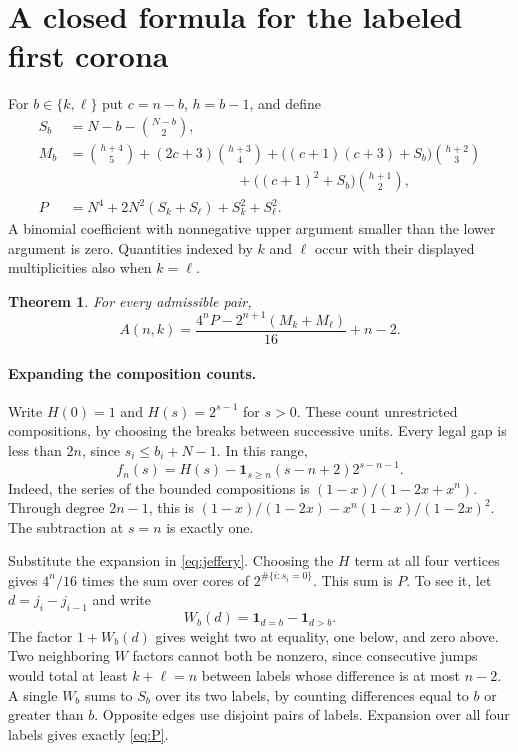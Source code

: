 \documentclass[11pt,letterpaper]{article}
\newtheorem{theorem}{Theorem}[section]
\newcommand{\one}{\mathbf 1}
\newcommand{\cc}[2]{\binom{#1}{#2}}
\begin{document}
\newpage
\section{A closed formula for the labeled first corona}
For $b\in\{k,\ell\}$ put $c=n-b$, $h=b-1$, and define
\begin{align}
 S_b&=N-b-\cc{N-b}{2},\nonumber\\
 M_b&=\cc{h+4}{5}+(2c+3)\cc{h+3}{4}
  +\big((c+1)(c+3)+S_b\big)\cc{h+2}{3} \nonumber\\[-2pt]
 &\hspace{12em}+\big((c+1)^2+S_b\big)\cc{h+1}{2},\label{eq:mark}\\
 P&=N^4+2N^2(S_k+S_\ell)+S_k^2+S_\ell^2.\label{eq:P}
\end{align}
A binomial coefficient with nonnegative upper argument smaller than the lower argument is zero. Quantities indexed by $k$ and $\ell$ occur with their displayed multiplicities also when $k=\ell$.
\begin{theorem}\label{th:main}
For every admissible pair,
\begin{equation}\label{eq:main}
 \boxed{\displaystyle A(n,k)=\frac{4^n P-2^{n+1}(M_k+M_\ell)}{16}+n-2.}
\end{equation}
\end{theorem}

\paragraph{Expanding the composition counts.}
Write $H(0)=1$ and $H(s)=2^{s-1}$ for $s>0$. These count unrestricted compositions, by choosing the breaks between successive units. Every legal gap is less than $2n$, since $s_i\le b_i+N-1$. In this range,
\[
 f_n(s)=H(s)-\one_{s\ge n}(s-n+2)2^{s-n-1}.
\]
Indeed, the series of the bounded compositions is $(1-x)/(1-2x+x^n)$. Through degree $2n-1$, this is $(1-x)/(1-2x)-x^n(1-x)/(1-2x)^2$. The subtraction at $s=n$ is exactly one.

Substitute the expansion in \eqref{eq:jeffery}. Choosing the $H$ term at all four vertices gives $4^n/16$ times the sum over cores of $2^{\#\{i:s_i=0\}}$. This sum is $P$. To see it, let $d=j_i-j_{i-1}$ and write
\[
 W_b(d)=\one_{d=b}-\one_{d>b}.
\]
The factor $1+W_b(d)$ gives weight two at equality, one below, and zero above. Two neighboring $W$ factors cannot both be nonzero, since consecutive jumps would total at least $k+\ell=n$ between labels whose difference is at most $n-2$. A single $W_b$ sums to $S_b$ over its two labels, by counting differences equal to $b$ or greater than $b$. Opposite edges use disjoint pairs of labels. Expansion over all four labels gives exactly \eqref{eq:P}.
\end{document}
